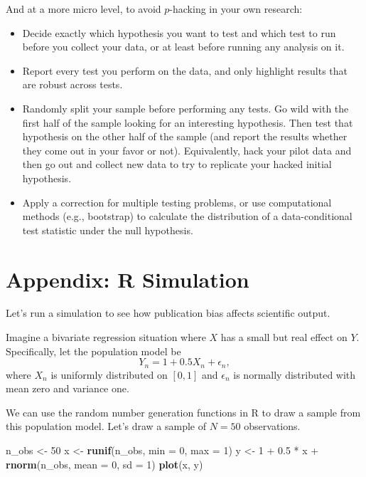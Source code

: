 \documentclass[12pt,oneside,openany]{book}
\newenvironment{Shaded}{\begin{snugshade}}{\end{snugshade}}
\newcommand{\KeywordTok}[1]{\textcolor[rgb]{0.13,0.29,0.53}{\textbf{{#1}}}}
\newcommand{\DataTypeTok}[1]{\textcolor[rgb]{0.13,0.29,0.53}{{#1}}}
\newcommand{\DecValTok}[1]{\textcolor[rgb]{0.00,0.00,0.81}{{#1}}}
\newcommand{\FloatTok}[1]{\textcolor[rgb]{0.00,0.00,0.81}{{#1}}}
\newcommand{\StringTok}[1]{\textcolor[rgb]{0.31,0.60,0.02}{{#1}}}
\newcommand{\NormalTok}[1]{{#1}}
\begin{document}
And at a more micro level, to avoid \(p\)-hacking in your own research:

\begin{itemize}
\item
  Decide exactly which hypothesis you want to test and which test to run
  before you collect your data, or at least before running any analysis
  on it.
\item
  Report every test you perform on the data, and only highlight results
  that are robust across tests.
\item
  Randomly split your sample before performing any tests. Go wild with
  the first half of the sample looking for an interesting hypothesis.
  Then test that hypothesis on the other half of the sample (and report
  the results whether they come out in your favor or not). Equivalently,
  hack your pilot data and then go out and collect new data to try to
  replicate your hacked initial hypothesis.
\item
  Apply a correction for multiple testing problems, or use computational
  methods (e.g., bootstrap) to calculate the distribution of a
  data-conditional test statistic under the null hypothesis.
\end{itemize}

\section{Appendix: R Simulation}\label{appendix-r-simulation}

Let's run a simulation to see how publication bias affects scientific
output.

Imagine a bivariate regression situation where \(X\) has a small but
real effect on \(Y\). Specifically, let the population model be \[
Y_n = 1 + 0.5 X_n + \epsilon_n,
\] where \(X_n\) is uniformly distributed on \([0, 1]\) and
\(\epsilon_n\) is normally distributed with mean zero and variance one.

We can use the random number generation functions in R to draw a sample
from this population model. Let's draw a sample of \(N = 50\)
observations.

\begin{Shaded}
\begin{Highlighting}[]
\NormalTok{n_obs <-}\StringTok{ }\DecValTok{50}
\NormalTok{x <-}\StringTok{ }\KeywordTok{runif}\NormalTok{(n_obs, }\DataTypeTok{min =} \DecValTok{0}\NormalTok{, }\DataTypeTok{max =} \DecValTok{1}\NormalTok{)}
\NormalTok{y <-}\StringTok{ }\DecValTok{1} \NormalTok{+}\StringTok{ }\FloatTok{0.5} \NormalTok{*}\StringTok{ }\NormalTok{x +}\StringTok{ }\KeywordTok{rnorm}\NormalTok{(n_obs, }\DataTypeTok{mean =} \DecValTok{0}\NormalTok{, }\DataTypeTok{sd =} \DecValTok{1}\NormalTok{)}
\KeywordTok{plot}\NormalTok{(x, y)}
\end{Highlighting}
\end{Shaded}
\end{document}
